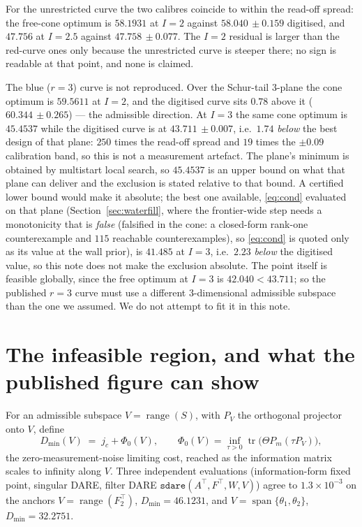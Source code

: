 For the unrestricted curve the two calibres coincide to within the read-off
spread: the free-cone optimum is $58.1931$ at $I=2$ against
$58.040\,\pm0.159$ digitised, and $47.756$ at $I=2.5$ against
$47.758\,\pm0.077$. The $I=2$ residual is larger than the red-curve ones only
because the unrestricted curve is steeper there; no sign is readable at that
point, and none is claimed. 

\begin{remark}
\label{rmk:blue}
The blue ($r=3$) curve is not reproduced. Over the Schur-tail $3$-plane the cone
optimum is $59.5611$ at $I=2$, and the digitised curve sits $0.78$ above it
($60.344\,\pm0.265$) --- the admissible direction. At $I=3$ the same cone optimum
is $45.4537$ while the digitised curve is at $43.711\,\pm0.007$, i.e.\ $1.74$
\emph{below} the best design of that plane: $250$ times the read-off spread and
$19$ times the $\pm0.09$ calibration band, so this is not a measurement artefact.
The plane's minimum is obtained by multistart local search, so $45.4537$ is an
upper bound on what that plane can deliver and the exclusion is stated relative
to that bound. A certified lower bound would make it absolute; the best one
available, \eqref{eq:cond} evaluated on that plane (Section~\ref{sec:waterfill},
where the frontier-wide step needs a monotonicity that is \emph{false}
(falsified in the cone: a closed-form rank-one counterexample and $115$
reachable counterexamples), so \eqref{eq:cond} is quoted only as its value at
the wall prior), is $41.485$ at $I=3$, i.e.\ $2.23$ \emph{below} the digitised value, so
this note does not make the exclusion absolute.
The point itself is feasible globally, since the free optimum at $I=3$ is
$42.040<43.711$; so the published $r=3$ curve must use a different
$3$-dimensional admissible subspace than the one we assumed. We do not attempt
to fit it in this note. 
\end{remark}

\section{The infeasible region, and what the published figure can show}
\label{sec:infeasible}

For an admissible subspace $V=\operatorname{range}(S)$, with $P_V$ the orthogonal
projector onto $V$, define
\begin{equation}
 D_{\min}(V)\;=\;j_c+\Phi_0(V),\qquad
 \Phi_0(V)=\inf_{\tau>0}\operatorname{tr}\!\big(\Theta P_m(\tau P_V)\big),
\end{equation}
the zero-measurement-noise limiting cost, reached as the information matrix
scales to infinity along $V$. Three independent evaluations (information-form
fixed point, singular DARE, filter DARE
$\texttt{sdare}(A^{\top},F^{\top},W,V)$) agree to $1.3\times10^{-3}$ on the
anchors $V=\operatorname{range}(F_2^{\top})$, $D_{\min}=46.1231$, and
$V=\operatorname{span}\{\theta_1,\theta_2\}$, $D_{\min}=32.2751$.


